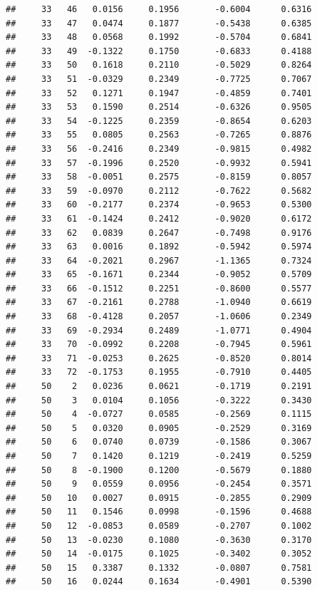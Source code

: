 \documentclass[
]{article}
\begin{document}
\begin{verbatim}
##     33   46   0.0156     0.1956       -0.6004      0.6316  
##     33   47   0.0474     0.1877       -0.5438      0.6385  
##     33   48   0.0568     0.1992       -0.5704      0.6841  
##     33   49  -0.1322     0.1750       -0.6833      0.4188  
##     33   50   0.1618     0.2110       -0.5029      0.8264  
##     33   51  -0.0329     0.2349       -0.7725      0.7067  
##     33   52   0.1271     0.1947       -0.4859      0.7401  
##     33   53   0.1590     0.2514       -0.6326      0.9505  
##     33   54  -0.1225     0.2359       -0.8654      0.6203  
##     33   55   0.0805     0.2563       -0.7265      0.8876  
##     33   56  -0.2416     0.2349       -0.9815      0.4982  
##     33   57  -0.1996     0.2520       -0.9932      0.5941  
##     33   58  -0.0051     0.2575       -0.8159      0.8057  
##     33   59  -0.0970     0.2112       -0.7622      0.5682  
##     33   60  -0.2177     0.2374       -0.9653      0.5300  
##     33   61  -0.1424     0.2412       -0.9020      0.6172  
##     33   62   0.0839     0.2647       -0.7498      0.9176  
##     33   63   0.0016     0.1892       -0.5942      0.5974  
##     33   64  -0.2021     0.2967       -1.1365      0.7324  
##     33   65  -0.1671     0.2344       -0.9052      0.5709  
##     33   66  -0.1512     0.2251       -0.8600      0.5577  
##     33   67  -0.2161     0.2788       -1.0940      0.6619  
##     33   68  -0.4128     0.2057       -1.0606      0.2349  
##     33   69  -0.2934     0.2489       -1.0771      0.4904  
##     33   70  -0.0992     0.2208       -0.7945      0.5961  
##     33   71  -0.0253     0.2625       -0.8520      0.8014  
##     33   72  -0.1753     0.1955       -0.7910      0.4405  
##     50    2   0.0236     0.0621       -0.1719      0.2191  
##     50    3   0.0104     0.1056       -0.3222      0.3430  
##     50    4  -0.0727     0.0585       -0.2569      0.1115  
##     50    5   0.0320     0.0905       -0.2529      0.3169  
##     50    6   0.0740     0.0739       -0.1586      0.3067  
##     50    7   0.1420     0.1219       -0.2419      0.5259  
##     50    8  -0.1900     0.1200       -0.5679      0.1880  
##     50    9   0.0559     0.0956       -0.2454      0.3571  
##     50   10   0.0027     0.0915       -0.2855      0.2909  
##     50   11   0.1546     0.0998       -0.1596      0.4688  
##     50   12  -0.0853     0.0589       -0.2707      0.1002  
##     50   13  -0.0230     0.1080       -0.3630      0.3170  
##     50   14  -0.0175     0.1025       -0.3402      0.3052  
##     50   15   0.3387     0.1332       -0.0807      0.7581  
##     50   16   0.0244     0.1634       -0.4901      0.5390  

\end{verbatim}
\end{document}
